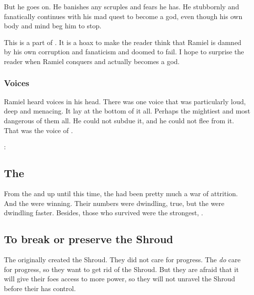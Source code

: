 But he goes on. 
He banishes any scruples and fears he has. 
He stubbornly and fanatically continues with his mad quest to become a god, even though his own body and mind beg him to stop. 

This is a part of . 
It is a hoax to make the reader think that Ramiel is damned by his own corruption and fanaticism and doomed to fail. 
I hope to surprise the reader when Ramiel conquers and actually becomes a god. 





\subsubsection{Voices}
Ramiel heard voices in his head. 
There was one voice that was particularly loud, deep and menacing.
It lay at the bottom of it all.
Perhaps the mightiest and most dangerous of them all. 
He could not subdue it, and he could not flee from it. 
That was the voice of \Nexagglachel. 

\begin{prose}
  \Nexagglachel:
\end{prose}
 







\subsection{The \Feud}
From the \Shrouding{} and up until this time, the \feud{} had been pretty much a war of attrition. 
And the \resphain{} were winning. 
Their numbers were dwindling, true, but the \dragons{} were dwindling faster. 
Besides, those \resphain{} who survived were the strongest, . 







\subsection{To break or preserve the Shroud}
The \dragons{} originally created the Shroud. They did not care for progress. The \resphain{} \emph{do} care for progress, so they want to get rid of the Shroud. But they are afraid that it will give their \draconic{} foes access to more \xsic{} power, so they will not unravel the Shroud before their \matrix{} has control. 

